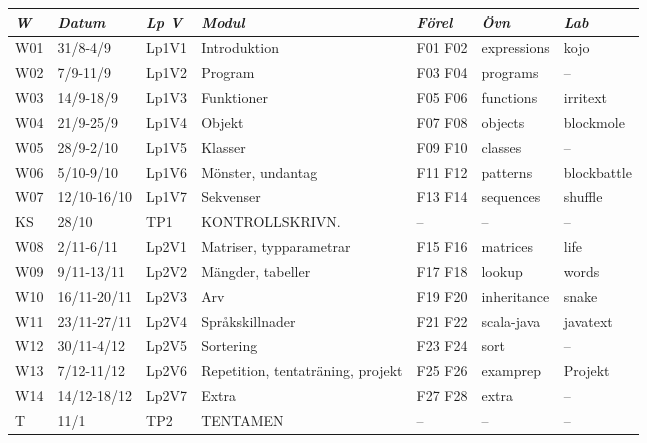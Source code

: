 \begin{tabular}{l|l|l|l|l|l|l}
\textit{W} & \textit{Datum} & \textit{Lp V} & \textit{Modul} & \textit{Förel} & \textit{Övn} & \textit{Lab} \\ \hline \hline
W01 & 31/8-4/9 & Lp1V1 & Introduktion & F01 F02 & expressions & kojo \\
W02 & 7/9-11/9 & Lp1V2 & Program & F03 F04 & programs & -- \\
W03 & 14/9-18/9 & Lp1V3 & Funktioner & F05 F06 & functions & irritext \\
W04 & 21/9-25/9 & Lp1V4 & Objekt & F07 F08 & objects & blockmole \\
W05 & 28/9-2/10 & Lp1V5 & Klasser & F09 F10 & classes & -- \\
W06 & 5/10-9/10 & Lp1V6 & Mönster, undantag & F11 F12 & patterns & blockbattle \\
W07 & 12/10-16/10 & Lp1V7 & Sekvenser & F13 F14 & sequences & shuffle \\
KS & 28/10 & TP1 & KONTROLLSKRIVN. & -- & -- & -- \\
W08 & 2/11-6/11 & Lp2V1 & Matriser, typparametrar & F15 F16 & matrices & life \\
W09 & 9/11-13/11 & Lp2V2 & Mängder, tabeller & F17 F18 & lookup & words \\
W10 & 16/11-20/11 & Lp2V3 & Arv & F19 F20 & inheritance & snake \\
W11 & 23/11-27/11 & Lp2V4 & Språkskillnader & F21 F22 & scala-java & javatext \\
W12 & 30/11-4/12 & Lp2V5 & Sortering & F23 F24 & sort & -- \\
W13 & 7/12-11/12 & Lp2V6 & Repetition, tentaträning, projekt & F25 F26 & examprep & Projekt \\
W14 & 14/12-18/12 & Lp2V7 & Extra & F27 F28 & extra & -- \\
T & 11/1 & TP2 & TENTAMEN & -- & -- & -- \\
\end{tabular}
